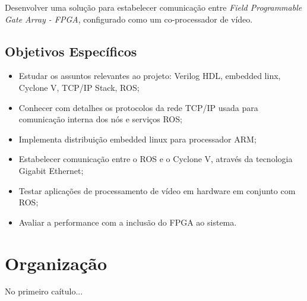 Desenvolver uma solução para estabelecer comunicação entre \textit{Field Programmable Gate Array - FPGA}, 
configurado como um co-processador de vídeo.

\subsection{Objetivos Específicos}

\begin{itemize}
    \item Estudar os assuntos relevantes ao projeto: Verilog HDL, embedded linx,  Cyclone V, 
    TCP/IP Stack, ROS;
    \item Conhecer com detalhes os protocolos da rede TCP/IP usada para comunicação interna dos 
    nós e serviços ROS;
    \item Implementa distribuição embedded linux para processador ARM;
    \item Estabelecer comunicação entre o ROS e o Cyclone V, através da tecnologia Gigabit Ethernet;
    \item Testar aplicações de processamento de vídeo em hardware em conjunto com ROS;
    \item Avaliar a performance com a inclusão do FPGA ao sistema.
\end{itemize}


\section{Organização}

 No primeiro caítulo...